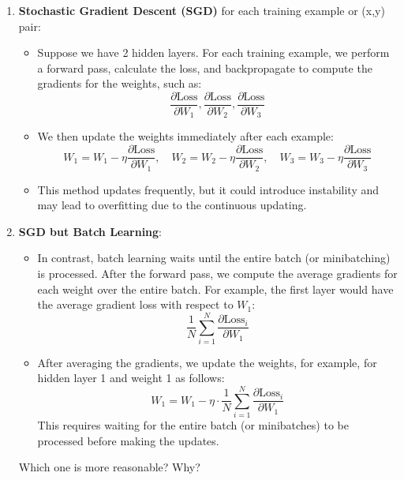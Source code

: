 \documentclass{article}
\begin{document}
\begin{enumerate}
    \item \textbf{Stochastic Gradient Descent (SGD)} for each training example or (x,y) pair:
    \begin{itemize}
        \item Suppose we have 2 hidden layers. For each training example, we perform a forward pass, calculate the loss, and backpropagate to compute the gradients for the weights, such as:
        \[
        \frac{\partial \text{Loss}}{\partial W_1}, \frac{\partial \text{Loss}}{\partial W_2}, \frac{\partial \text{Loss}}{\partial W_3}
        \]
        \item We then update the weights immediately after each example:
        \[
        W_1 = W_1 - \eta \frac{\partial \text{Loss}}{\partial W_1}, \quad W_2 = W_2 - \eta \frac{\partial \text{Loss}}{\partial W_2}, \quad W_3 = W_3 - \eta \frac{\partial \text{Loss}}{\partial W_3}
        \]
        \item This method updates frequently, but it could introduce instability and may lead to overfitting due to the continuous updating.
    \end{itemize}

    \item \textbf{SGD but Batch Learning}:
    \begin{itemize}
        \item In contrast, batch learning waits until the entire batch (or minibatching) is processed. After the forward pass, we compute the average gradients for each weight over the entire batch. For example, the first layer would have the average gradient loss with respect to \(W_1\):
        \[
        \frac{1}{N} \sum_{i=1}^{N} \frac{\partial \text{Loss}_i}{\partial W_1}
        \]
        \item After averaging the gradients, we update the weights, for example, for hidden layer 1 and weight 1 as follows:
        \[
        W_1 = W_1 - \eta \cdot \frac{1}{N} \sum_{i=1}^{N} \frac{\partial \text{Loss}_i}{\partial W_1}
        \]
        This requires waiting for the entire batch (or minibatches) to be processed before making the updates.
    \end{itemize}

Which one is more reasonable? Why?

\end{enumerate}
\end{document}
